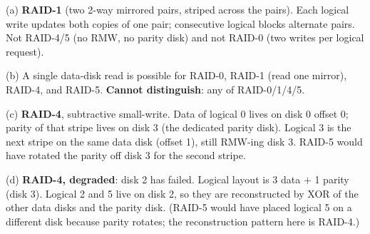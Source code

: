 \documentclass[11pt,a4paper]{article}
\newenvironment{Sol}{%
  \begin{tcolorbox}[sboxstyle, title={Solution}]%
}{%
  \end{tcolorbox}\vspace{0.35em}%
}
\begin{document}
\begin{Sol}
(a) \textbf{RAID-1} (two 2-way mirrored pairs, striped across the
pairs). Each logical write updates both copies of one pair; consecutive
logical blocks alternate pairs. Not RAID-4/5 (no RMW, no parity disk)
and not RAID-0 (two writes per logical request).

(b) A single data-disk read is possible for RAID-0, RAID-1 (read one
mirror), RAID-4, and RAID-5. \textbf{Cannot distinguish}: any of
RAID-0/1/4/5.

(c) \textbf{RAID-4}, subtractive small-write. Data of logical 0 lives
on disk 0 offset 0; parity of that stripe lives on disk 3 (the dedicated
parity disk). Logical 3 is the next stripe on the same data disk
(offset 1), still RMW-ing disk 3. RAID-5 would have rotated the parity
off disk 3 for the second stripe.

(d) \textbf{RAID-4, degraded}: disk 2 has failed. Logical layout is
3 data $+$ 1 parity (disk 3). Logical 2 and 5 live on disk 2, so they
are reconstructed by XOR of the other data disks and the parity disk.
(RAID-5 would have placed logical 5 on a different disk because parity
rotates; the reconstruction pattern here is RAID-4.)
\end{Sol}
\end{document}
